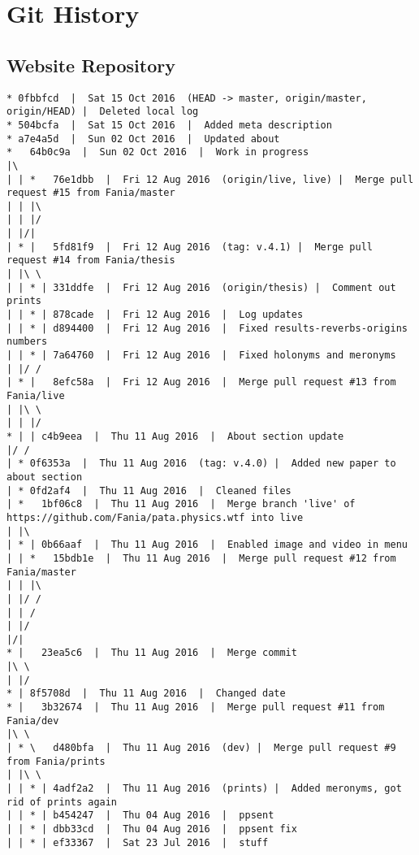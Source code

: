 
\chapter{Git History}
\label{app:git}

\vspace{5cm}


\section{Website Repository}

\begin{verbatim}
* 0fbbfcd  |  Sat 15 Oct 2016  (HEAD -> master, origin/master, origin/HEAD) |  Deleted local log
* 504bcfa  |  Sat 15 Oct 2016  |  Added meta description
* a7e4a5d  |  Sun 02 Oct 2016  |  Updated about
*   64b0c9a  |  Sun 02 Oct 2016  |  Work in progress
|\  
| | *   76e1dbb  |  Fri 12 Aug 2016  (origin/live, live) |  Merge pull request #15 from Fania/master
| | |\  
| | |/  
| |/|   
| * |   5fd81f9  |  Fri 12 Aug 2016  (tag: v.4.1) |  Merge pull request #14 from Fania/thesis
| |\ \  
| | * | 331ddfe  |  Fri 12 Aug 2016  (origin/thesis) |  Comment out prints
| | * | 878cade  |  Fri 12 Aug 2016  |  Log updates
| | * | d894400  |  Fri 12 Aug 2016  |  Fixed results-reverbs-origins numbers
| | * | 7a64760  |  Fri 12 Aug 2016  |  Fixed holonyms and meronyms
| |/ /  
| * |   8efc58a  |  Fri 12 Aug 2016  |  Merge pull request #13 from Fania/live
| |\ \  
| | |/  
* | | c4b9eea  |  Thu 11 Aug 2016  |  About section update
|/ /  
| * 0f6353a  |  Thu 11 Aug 2016  (tag: v.4.0) |  Added new paper to about section
| * 0fd2af4  |  Thu 11 Aug 2016  |  Cleaned files
| *   1bf06c8  |  Thu 11 Aug 2016  |  Merge branch 'live' of https://github.com/Fania/pata.physics.wtf into live
| |\  
| * | 0b66aaf  |  Thu 11 Aug 2016  |  Enabled image and video in menu
| | *   15bdb1e  |  Thu 11 Aug 2016  |  Merge pull request #12 from Fania/master
| | |\  
| |/ /  
| | /   
| |/    
|/|     
* |   23ea5c6  |  Thu 11 Aug 2016  |  Merge commit
|\ \  
| |/  
* | 8f5708d  |  Thu 11 Aug 2016  |  Changed date
* |   3b32674  |  Thu 11 Aug 2016  |  Merge pull request #11 from Fania/dev
|\ \  
| * \   d480bfa  |  Thu 11 Aug 2016  (dev) |  Merge pull request #9 from Fania/prints
| |\ \  
| | * | 4adf2a2  |  Thu 11 Aug 2016  (prints) |  Added meronyms, got rid of prints again
| | * | b454247  |  Thu 04 Aug 2016  |  ppsent
| | * | dbb33cd  |  Thu 04 Aug 2016  |  ppsent fix
| | * | ef33367  |  Sat 23 Jul 2016  |  stuff

\end{verbatim}
